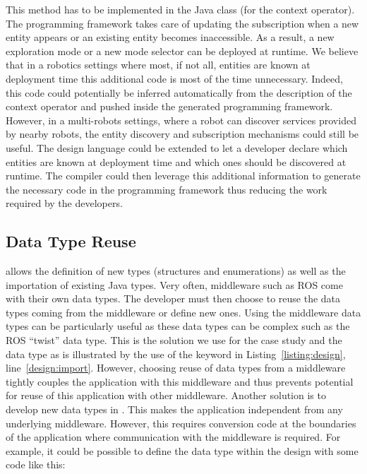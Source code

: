This method has to be implemented in the  Java class (for
the  context operator). The programming framework takes
care of updating the subscription when a new entity appears or an
existing entity becomes inaccessible. As a result, a new exploration
mode or a new mode selector can be deployed at runtime. We believe
that in a robotics settings where most, if not all, entities are known
at deployment time this additional code is most of the time
unnecessary. Indeed, this code could potentially be inferred
automatically from the description of the  context operator
and pushed inside the generated programming framework. However, in a
multi-robots settings, where a robot can discover services provided by
nearby robots, the \diaspec{} entity discovery and subscription
mechanisms could still be useful. The \diaspec{} design language could
be extended to let a developer declare which entities are known at
deployment time and which ones should be discovered at runtime. The
compiler could then leverage this additional information to generate
the necessary code in the programming framework thus reducing the work
required by the developers.

\subsection{Data Type Reuse}

\diaspec{} allows the definition of new types (structures and
enumerations) as well as the importation of existing Java types. Very
often, middleware such as ROS come with their own data types. The
developer must then choose to reuse the data types coming from the
middleware or define new ones. Using the middleware data types can be
particularly useful as these data types can be complex such as the ROS
``twist'' data type. This is the solution we use for the case study
and the  data type as is illustrated by the use of the
 keyword in Listing~\ref{listing:design},
line~\ref{design:import}. However, choosing reuse of data types from a
middleware tightly couples the application with this middleware and
thus prevents potential for reuse of this application with other
middleware. Another solution is to develop new data types in
\diaspec{}. This makes the application independent from any underlying
middleware. However, this requires conversion code at the boundaries
of the application where communication with the middleware is
required. For example, it could be possible to define the 
data type within the design with some code like this:


